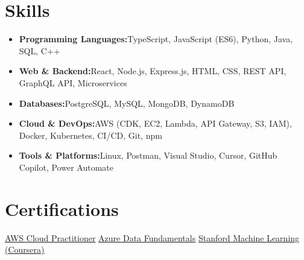 \documentclass[a4paper,10pt]{article}
\newcommand{\resumeItem}[2]{\item{\textbf{#1}{\hspace{0.5mm}#2 \vspace{-0.5mm}}}}
\newcommand{\resumeSubItem}[2]{\resumeItem{#1}{#2}\vspace{-3pt}}
\newcommand{\resumeHeadingSkillStart}{\begin{itemize}[leftmargin=*, itemsep=0.6mm, rightmargin=2ex]}
\newcommand{\resumeHeadingSkillEnd}{\end{itemize}\vspace{-2mm}}
\begin{document}
\section{\textbf{Skills}}
\resumeHeadingSkillStart
\resumeSubItem{Programming Languages:}{TypeScript, JavaScript (ES6), Python, Java, SQL, C++}
\resumeSubItem{Web \& Backend:}{React, Node.js, Express.js, HTML, CSS, REST API, GraphQL API, Microservices}
\resumeSubItem{Databases:}{PostgreSQL, MySQL, MongoDB, DynamoDB}
\resumeSubItem{Cloud \& DevOps:}{AWS (CDK, EC2, Lambda, API Gateway, S3, IAM), Docker, Kubernetes, CI/CD, Git, npm}
\resumeSubItem{Tools \& Platforms:}{Linux, Postman, Visual Studio, Cursor, GitHub Copilot, Power Automate}
\resumeHeadingSkillEnd
\vspace{0mm}

\section{\textbf{Certifications}}
\footnotesize{
\href{https://drive.google.com/file/d/1a3exoiS79RS3q8vSJHT-PpkczSPg54EZ/view}{AWS Cloud Practitioner} \hfill \href{https://drive.google.com/file/d/1VBJjfRMsIm8BckoUtLUV7ZbY88Jju2qT/view}{Azure Data Fundamentals} \hfill \href{https://drive.google.com/file/d/1At3BLkqJ9vuhPPUCcrNAw9yNH5li7XdQ/view}{Stanford Machine Learning (Coursera)}
}
\end{document}
